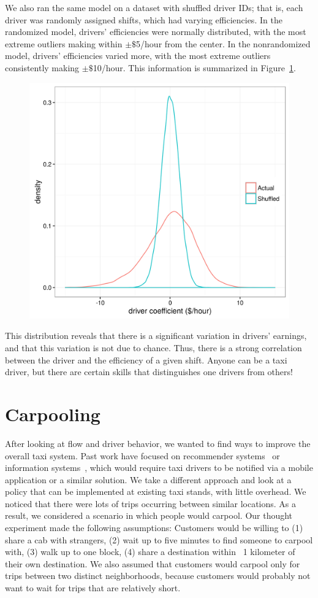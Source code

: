 \documentclass[twocolumn]{article}
\begin{document}
We also ran the same model on a dataset with shuffled driver IDs; that is, each driver was randomly assigned shifts, which had varying efficiencies. In the randomized model, drivers' efficiencies were normally distributed, with the most extreme outliers making within $\pm$$\$$5/hour from the center. In the nonrandomized model, drivers' efficiencies varied more, with the most extreme outliers consistently making $\pm$$\$$10/hour. This information is summarized in Figure~\ref{fig:efficiency}.
\begin{figure}[h]
  \centering
  \includegraphics[width=.9\linewidth]{efficiency}
  \label{fig:efficiency}
\end{figure}
This distribution reveals that there is a significant variation in drivers’ earnings, and that this variation is not due to chance. Thus, there is a strong correlation between the driver and the efficiency of a given shift. Anyone can be a taxi driver, but there are certain skills that distinguishes one drivers from others! 
\section{Carpooling}
After looking at flow and driver behavior, we wanted to find ways to improve the overall taxi system. Past work have focused on recommender systems~\cite{ZHAN:2014} or information systems~\cite{KIM:2005}, which would require taxi drivers to be notified via a mobile application or a similar solution. We take a different approach and look at a policy that can be implemented at existing taxi stands, with little overhead. We noticed that there were lots of trips occurring between similar locations. As a result, we considered a scenario in which people would carpool. Our thought experiment made the following assumptions: Customers would be willing to (1) share a cab with strangers, (2) wait up to five minutes to find someone to carpool with, (3) walk up to one block, (4) share a destination within ~1 kilometer of their own destination. We also assumed that customers would carpool only for trips between two distinct neighborhoods, because customers would probably not want to wait for trips that are relatively short.
\end{document}
